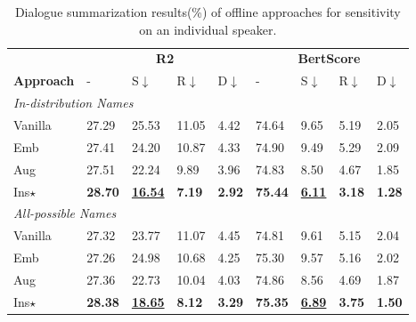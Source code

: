 \begin{table}[]
	\scriptsize
	\centering
	\begin{tabular}{p{0.9cm}|p{0.36cm}p{0.36cm}p{0.36cm}p{0.36cm}|p{0.36cm}p{0.36cm}p{0.36cm}p{0.38cm}}
		\toprule[1pt]
		
		
		 & \multicolumn{4}{c|}{\textbf{R2}} & \multicolumn{4}{c}{\textbf{BertScore}} \\
		\textbf{Approach}& - & S$\downarrow$  & R$\downarrow$ & D$\downarrow$& - & S$\downarrow$  & R$\downarrow$& D$\downarrow$ \\
		\hline
		\multicolumn{7}{l}{\textit{In-distribution Names}}\\
		Vanilla & 27.29 &25.53 & 11.05& 4.42& 74.64 &9.65&5.19 & 2.05\\
		Emb & 27.41 &24.20 & 10.87 & 4.33& 74.90 &9.49 & 5.29& 2.09 \\
		Aug &
		{27.51} & 22.24 & {9.89} & {3.96} &74.83&8.50 & 4.67 & {1.85}\\
		Ins$\star$ & \textbf{28.70} &\underline{\textbf{16.54}}  & \textbf{7.19} & \textbf{2.92}& \textbf{75.44}&\underline{\textbf{6.11}}& \textbf{3.18}& \textbf{1.28} \\
		
		\hline
		\multicolumn{7}{l}{\textit{All-possible Names}}\\
		Vanilla &
		27.32& 23.77  & 11.07 & 4.45&74.81 &9.61 &5.15& 2.04  \\
		Emb & 27.26 & 24.98 & 10.68 & 4.25& 75.30&9.57 & 5.16& 2.02\\
		Aug  &
		27.36 & 22.73 & {10.04} & {4.03} &74.86&8.56 & 4.69 & 1.87\\
		Ins$\star$  & \textbf{28.38} &\underline{\textbf{18.65}} & \textbf{8.12}& \textbf{3.29}  &\textbf{75.35} &\underline{\textbf{6.89}}& \textbf{3.75} & \textbf{1.50} \\
		
		\bottomrule[1pt]
	\end{tabular}
	\caption{Dialogue summarization results(\%) of offline approaches for sensitivity on an individual speaker.}
	\label{tab: change-one-name}
\end{table}


